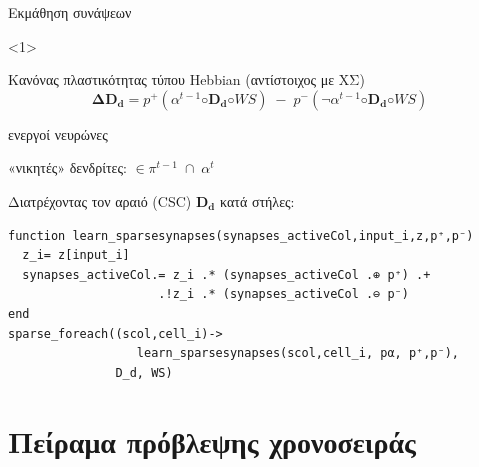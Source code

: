 \documentclass[10pt,lualatex]{beamer}
\begin{document}
\begin{frame}[fragile]{Εκμάθηση συνάψεων}
\begin{onlyenv}<1>
\begin{block}{Κανόνας πλαστικότητας τύπου Hebbian {\small (αντίστοιχος με ΧΣ)}}
  \[ \mathbf{ΔD_d} = p^+(α^{t-1}◦\mathbf{D_d}◦\mathit{WS}) \;-\; p^-(\lnot α^{t-1}◦ \mathbf{D_d}◦\mathit{WS}) \]
  \vspace{-1.0\topsep}
  \begin{description}[fffff]
		\item[$α$] ενεργοί νευρώνες
    \item[$\mathit{WS}$] «νικητές» δενδρίτες: $\in π^{t-1} \;\cap\; α^t$
  \end{description}
\end{block}

Διατρέχοντας τον αραιό (CSC) $\mathbf{D_d}$ κατά στήλες:
\begin{verbatim}
function learn_sparsesynapses(synapses_activeCol,input_i,z,p⁺,p⁻)
  z_i= z[input_i]
  synapses_activeCol.= z_i .* (synapses_activeCol .⊕ p⁺) .+
                     .!z_i .* (synapses_activeCol .⊖ p⁻)
end
sparse_foreach((scol,cell_i)->
                  learn_sparsesynapses(scol,cell_i, pα, p⁺,p⁻),
               D_d, WS)
\end{verbatim}
\end{onlyenv}
\end{frame}

\section{Πείραμα πρόβλεψης χρονοσειράς}
\end{document}
